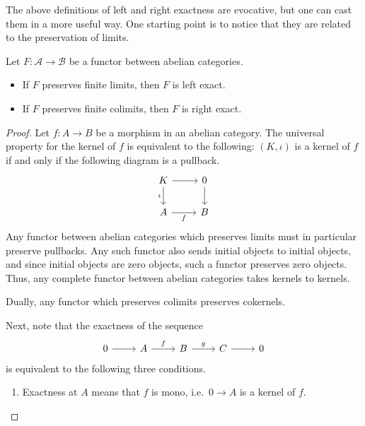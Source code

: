 \documentclass[main.tex]{subfiles}
\begin{document}
The above definitions of left and right exactness are evocative, but one can cast them in a more useful way. One starting point is to notice that they are related to the preservation of limits.

\begin{proposition}
  \label{prop:exact_if_preserve_limits_conditions}
  Let $F\colon \mathcal{A} \to \mathcal{B}$ be a functor between abelian categories.
  \begin{itemize}
    \item If $F$ preserves finite limits, then $F$ is left exact.

    \item If $F$ preserves finite colimits, then $F$ is right exact.
  \end{itemize}
\end{proposition}
\begin{proof}
  Let $f\colon A \to B$ be a morphism in an abelian category. The universal property for the kernel of $f$ is equivalent to the following: $(K, \iota)$ is a kernel of $f$ if and only if the following diagram is a pullback.
  \begin{equation*}
    \begin{tikzcd}
      K
      \arrow[r]
      \arrow[d, swap, "\iota"]
      & 0
      \arrow[d]
      \\
      A
      \arrow[r, swap, "f"]
      & B
    \end{tikzcd}
  \end{equation*}
  Any functor between abelian categories which preserves limits must in particular preserve pullbacks. Any such functor also sends initial objects to initial objects, and since initial objects are zero objects, such a functor preserves zero objects. Thus, any complete functor between abelian categories takes kernels to kernels.

  Dually, any functor which preserves colimits preserves cokernels.

  Next, note that the exactness of the sequence
  \begin{equation*}
    \begin{tikzcd}
      0
      \arrow[r]
      & A
      \arrow[r, "f"]
      & B
      \arrow[r, "g"]
      & C
      \arrow[r]
      & 0
    \end{tikzcd}
  \end{equation*}
  is equivalent to the following three conditions.
  \begin{enumerate}
    \item Exactness at $A$ means that $f$ is mono, i.e.\ $0 \to A$ is a kernel of $f$.


\end{enumerate}
\end{proof}
\end{document}
